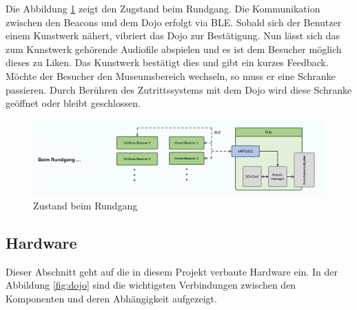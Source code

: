 \documentclass[10pt,a4paper,oneside]{99_fhnwreport}
\begin{document}
Die Abbildung \ref{fig:image4} zeigt den Zugstand beim Rundgang. Die Kommunikation zwischen den Beacons und dem Dojo erfolgt via BLE. Sobald sich der Benutzer einem Kunstwerk nähert, vibriert das Dojo zur Bestätigung. Nun lässt sich das zum Kunstwerk gehörende Audiofile abspielen und es ist dem Besucher möglich dieses zu Liken. Das Kunstwerk bestätigt dies und gibt ein kurzes Feedback. \\
Möchte der Besucher den Museumsbereich wechseln, so muss er eine Schranke passieren. Durch Berühren des Zutrittssystems mit dem Dojo wird diese Schranke geöffnet oder bleibt geschlossen.

\begin{figure}[htb]
\includegraphics[width=\textwidth]{Zustand_Rundgang.png}
\caption{Zustand beim Rundgang} %
\label{fig:image4}
\end{figure}

\newpage

\subsection{Hardware} \label{sec:hardware}

Dieser Abschnitt geht auf die in diesem Projekt verbaute Hardware ein. In der Abbildung \ref{fig:dojo} sind die wichtigsten Verbindungen zwischen den Komponenten und deren Abhängigkeit aufgezeigt.
\end{document}
